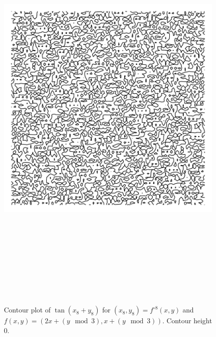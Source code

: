 \documentclass[12pt, a4paper]{amsart}
\begin{document}
\begin{figure}[!ht] 
\includegraphics[width=160mm, height=210mm]{images/arnolds_cat.pdf}
\caption{
Contour plot of $\tan(x_8 + y_8)$ for $(x_8, y_8) = f^{\circ 8}(x, y)$ and  $f(x, y) = (2x + (y \mod 3), x + (y \mod 3))$.
Contour height 0.
}
\end{figure}
\end{document}
